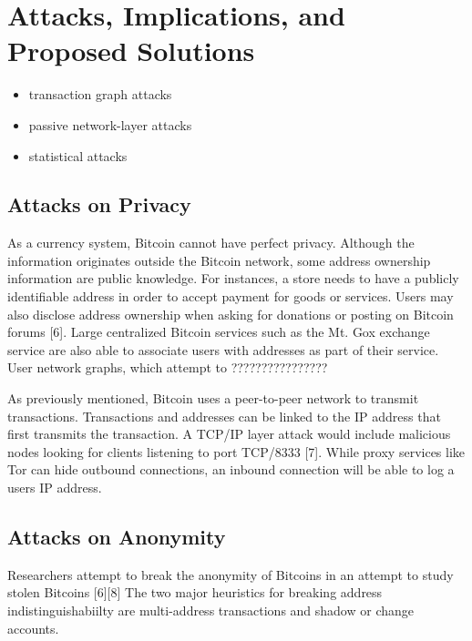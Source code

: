 \section{Attacks, Implications, and Proposed Solutions}
\begin{itemize}
	\item transaction graph attacks
	\item passive network-layer attacks
	\item statistical attacks
\end{itemize}


\subsection{Attacks on Privacy}
As a currency system, Bitcoin cannot have perfect privacy. Although the information originates outside the Bitcoin network, some address ownership information are public knowledge. For instances, a store needs to have a publicly identifiable address in order to accept payment for goods or services.  Users may also disclose address ownership when asking for donations or posting on Bitcoin forums [6]. Large centralized Bitcoin services such as the Mt. Gox exchange service are also able to associate users with addresses as part of their service.
User network graphs, which attempt to ????????????????

As previously mentioned, Bitcoin uses a peer-to-peer network to transmit transactions. Transactions and addresses can be linked to the IP address that first transmits the transaction. A TCP/IP layer attack would include malicious nodes looking for clients listening to port TCP/8333 [7]. While proxy services like Tor can hide outbound connections, an inbound connection will be able to log a users IP address.

\subsection{Attacks on Anonymity}
Researchers attempt to break the anonymity of Bitcoins in an attempt to study stolen Bitcoins [6][8] 
The two major heuristics for breaking address indistinguishabiilty are multi-address transactions and shadow or change accounts.

